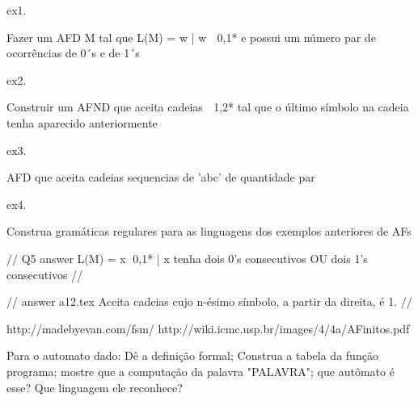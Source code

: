 
ex1.

Fazer um AFD M tal que
L(M) = {w | w  {0,1}* e possui um número par de
ocorrências de 0´s e de 1´s } 

ex2.

Construir um AFND que aceita cadeias  {1,2}* tal que o
último símbolo na cadeia tenha aparecido anteriormente

ex3.

AFD que aceita cadeias sequencias de 'abc' de quantidade par

ex4.

Construa gramáticas regulares para as
linguagens dos exemplos anteriores de
AFs

//
Q5 answer 
 L(M) = {x {0,1}* | x tenha dois 0’s
consecutivos OU dois 1’s consecutivos}
//

//
answer a12.tex
Aceita cadeias cujo n-ésimo símbolo, a partir da
direita, é 1.
//


http://madebyevan.com/fsm/
http://wiki.icmc.usp.br/images/4/4a/AFinitos.pdf

Para o automato dado: Dê a definição formal; Construa a tabela da função programa; mostre que a computação da palavra "PALAVRA"; que autômato é esse? Que linguagem ele reconhece?